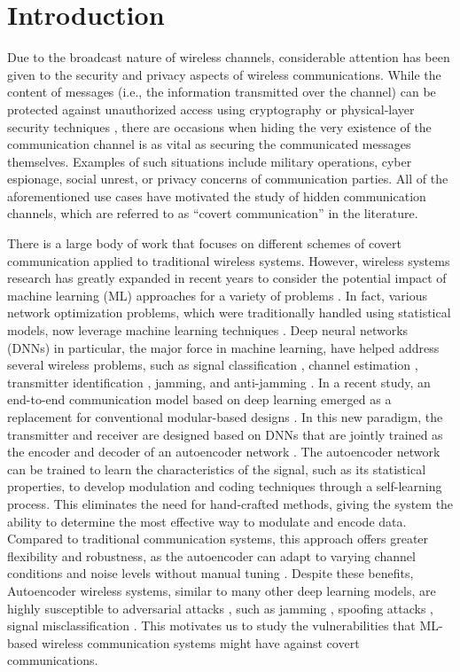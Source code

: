 \section{Introduction}
\label{s:intro}
Due to the broadcast nature of wireless channels, considerable attention has been given to the security and privacy aspects of wireless communications. While the content of messages (i.e., the information transmitted over the channel) can be protected against unauthorized access using cryptography or physical-layer security techniques \cite{zhou2013physical}, there are occasions when hiding the very existence of the communication channel is as vital as securing the communicated messages themselves. Examples of such situations include military operations, cyber espionage, social unrest, or privacy concerns of communication parties. All of the aforementioned use cases have motivated the study of hidden communication channels, which are referred to as ``covert communication'' \cite{lampson1973note, bloch2016covert} in the literature.

There is a large body of work that focuses on different schemes of covert communication applied to traditional wireless systems. However, wireless systems research has greatly expanded in recent years to consider the potential impact of machine learning (ML) approaches for a variety of problems \cite{wang2017deep}. In fact, various network optimization problems, which were traditionally handled using statistical models, now leverage machine learning techniques \cite{zhu2020toward}. Deep neural networks (DNNs) in particular, the major force in machine learning, have helped address several wireless problems, such as signal classification \cite{o2016radio, o2017introduction, wu2020deep, makkuva2021ko}, channel estimation \cite{soltani2019deep}, transmitter identification \cite{roy2019rfal, hanna2019deep}, jamming, and anti-jamming \cite{arjoune2020novel, bahramali2021robust}. In a recent study, an end-to-end communication model based on deep learning emerged as a replacement for conventional modular-based designs \cite{o2017introduction}. In this new paradigm, the transmitter and receiver are designed based on DNNs that are jointly trained as the encoder and decoder of an autoencoder network \cite{o2017introduction}. The autoencoder network can be trained to learn the characteristics of the signal, such as its statistical properties, to develop modulation and coding techniques through a self-learning process. This eliminates the need for hand-crafted methods, giving the system the ability to determine the most effective way to modulate and encode data. Compared to traditional communication systems, this approach offers greater flexibility and robustness, as the autoencoder can adapt to varying channel conditions and noise levels without manual tuning \cite{zou2021channel}. Despite these benefits, Autoencoder wireless systems, similar to many other deep learning models, are highly susceptible to adversarial attacks \cite{chakraborty2018adversarial}, such as jamming \cite{bahramali2021robust}, spoofing attacks \cite{shi2020generative}, signal misclassification \cite{sadeghi2019physical}. This motivates us to study the vulnerabilities that ML-based wireless communication systems might have against covert communications.

